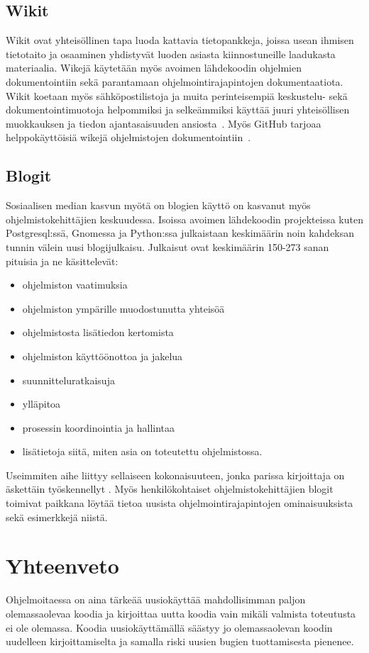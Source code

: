 \documentclass[finnish]{tktltiki2}
\theoremstyle{definition}
\theoremstyle{remark}
\begin{document}
\subsection{Wikit}
Wikit ovat yhteisöllinen tapa luoda kattavia tietopankkeja, joissa usean ihmisen tietotaito ja osaaminen yhdistyvät luoden asiasta kiinnostuneille laadukasta materiaalia. Wikejä käytetään myös avoimen lähdekoodin ohjelmien dokumentointiin sekä parantamaan ohjelmointirajapintojen dokumentaatiota. Wikit koetaan myös sähköpostilistoja ja muita perinteisempiä keskustelu- sekä dokumentointimuotoja helpommiksi ja selkeämmiksi käyttää juuri yhteisöllisen muokkauksen ja tiedon ajantasaisuuden ansiosta~\cite{using-wikis-in-sw}.
Myös GitHub tarjoaa helppokäyttöisiä wikejä ohjelmistojen dokumentointiin~\cite{github-wiki}.
\subsection{Blogit}
Sosiaalisen median kasvun myötä on blogien käyttö on kasvanut myös ohjelmistokehittäjien keskuudessa. Isoissa avoimen lähdekoodin projekteissa kuten Postgresql:ssä, Gnomessa ja Python:ssa julkaistaan keskimäärin noin kahdeksan tunnin välein uusi blogijulkaisu. Julkaisut ovat keskimäärin 150-273 sanan pituisia ja ne käsittelevät:
\begin{itemize}
  \item ohjelmiston vaatimuksia
  \item ohjelmiston ympärille muodostunutta yhteisöä
  \item ohjelmistosta lisätiedon kertomista
  \item ohjelmiston käyttöönottoa ja jakelua
  \item suunnitteluratkaisuja
  \item ylläpitoa
  \item prosessin koordinointia ja hallintaa
  \item lisätietoja siitä, miten asia on toteutettu ohjelmistossa.
\end{itemize}

Useimmiten aihe liittyy sellaiseen kokonaisuuteen, jonka parissa kirjoittaja on äskettäin työskennellyt \cite{how-dev-blog}.
Myös henkilökohtaiset ohjelmistokehittäjien blogit toimivat paikkana löytää tietoa uusista ohjelmointirajapintojen ominaisuuksista sekä esimerkkejä niistä.

\section{Yhteenveto}
Ohjelmoitaessa on aina tärkeää uusiokäyttää mahdollisimman paljon olemassaolevaa koodia ja kirjoittaa uutta koodia vain mikäli valmista toteutusta ei ole olemassa. Koodia uusiokäyttämällä säästyy jo olemassaolevan koodin uudelleen kirjoittamiselta ja samalla riski uusien bugien tuottamisesta pienenee.
\end{document}
